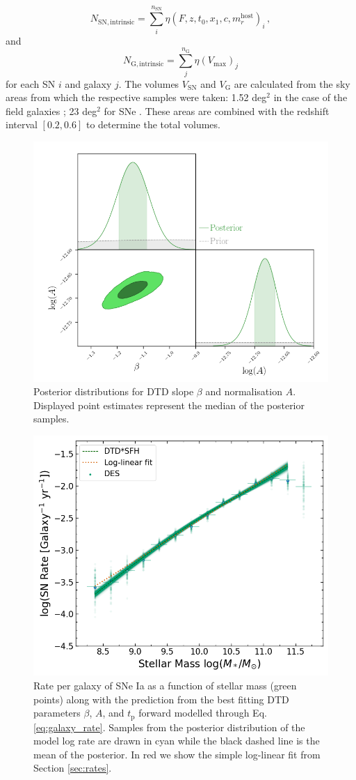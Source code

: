 \documentclass[fleqn,usenatbib]{mnras}
\begin{document}
\begin{equation}
    N_{\mathrm{SN,intrinsic}} = \sum_i^{n_{\mathrm{SN}}}\eta\left(F,z,t_0,x_1,c,m^{\mathrm{host}}_{r}\right)_{i}\,,
    \label{eq:corr_SN}
\end{equation}
and
\begin{equation}
    N_{\mathrm{G,intrinsic}} = \sum_j^{n_{\mathrm{G}}} \eta\left(V_{\mathrm{max}}\right)_{j} 
    \label{eq:corr_G}
\end{equation}
for each SN $i$ and galaxy $j$. The volumes $V_{\mathrm{SN}}$ and $V_{\mathrm{G}}$ are calculated from the sky areas from which the respective samples were taken: 1.52 deg$^2$ in the case of the field galaxies \citep{Hartley2020}; 23 deg$^2$ for SNe \citep{Smith2020a}. These areas are combined with the redshift interval $[0.2,0.6]$ to determine the total volumes.

\begin{figure}
    \centering
    \includegraphics[width=.5\textwidth]{figs/fit_dtd_all_A_beta_corner.png}
    \caption{Posterior distributions for DTD slope $\beta$ and normalisation $A$. Displayed point estimates represent the median of the posterior samples.%
    \label{fig:corner_beta_norm}}
\end{figure}
\begin{figure}
    \centering
    \includegraphics[width=.5\textwidth]{figs/rate_vs_mass_DTD_fit_beta_norm_Qerf1.1.png}
    \caption{Rate per galaxy of SNe Ia as a function of stellar mass (green points) along with the prediction from the best fitting DTD parameters $\beta$, $A$, and $t_{\mathrm{p}}$ forward modelled through Eq. \ref{eq:galaxy_rate}. Samples from the posterior distribution of the model log rate are drawn in cyan while the black dashed line is the mean of the posterior. In red we show the simple log-linear fit from Section \ref{sec:rates}.%
    \label{fig:rate_fitted}}
\end{figure}
\end{document}
